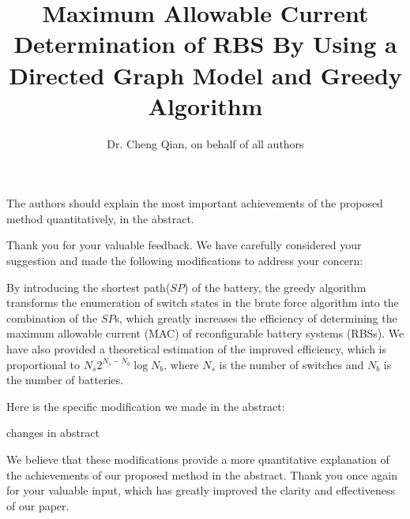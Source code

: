 \documentclass[12pt,american]{scrartcl}
\title{Maximum Allowable Current Determination of RBS By Using a Directed Graph Model and Greedy Algorithm}
\author{Dr. Cheng Qian, on behalf of all authors}
\begin{document}
\maketitle




\reviewer
\begin{revcomment}
  The authors should explain the most important achievements of the proposed method quantitatively, in the abstract.
\end{revcomment}
\begin{revresponse}

Thank you for your valuable feedback. We have carefully considered your suggestion and made the following modifications to address your concern:


By introducing the shortest path($SP$) of the battery, the greedy algorithm transforms the enumeration of switch states in the brute force algorithm into the combination of the $SP$s, which greatly increases the efficiency of determining the maximum allowable current (MAC) of reconfigurable battery systems (RBSs). We have also provided a theoretical estimation of the improved efficiency, which is proportional to $N_s 2^{N_s - N_b} \log N_b$, where $N_s$ is the number of switches and $N_b$ is the number of batteries.


Here is the specific modification we made in the abstract:
\begin{changes}
  changes in abstract
\end{changes}


We believe that these modifications provide a more quantitative explanation of the achievements of our proposed method in the abstract. 
Thank you once again for your valuable input, which has greatly improved the clarity and effectiveness of our paper.

\end{revresponse}
\end{document}
